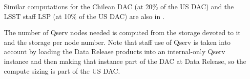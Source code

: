 Similar computations for the Chilean DAC (at 20\% of the US DAC) and the LSST staff LSP (at 10\% of the US DAC) are also in .

The number of Qserv nodes needed is computed from the storage devoted to it and the storage per node number.
Note that staff use of Qserv is taken into account by loading the Data Release products into an internal-only Qserv instance and then making that instance part of the DAC at Data Release, so the compute sizing is part of the US DAC.



